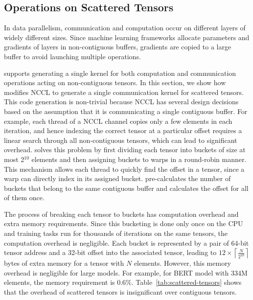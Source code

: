 \subsection{Operations on Scattered Tensors}
\label{sec:scattered-tensors}
In data parallelism, communication and computation occur on different layers of widely different sizes.
Since machine learning frameworks allocate parameters and gradients of layers in non-contiguous buffers,
gradients are copied to a large buffer to avoid launching multiple \allreduce operations.

\tool supports generating a single kernel for both computation and communication operations acting on non-contiguous tensors.
In this section, we show how \tool modifies NCCL to generate a single communication kernel for scattered tensors.
This code generation is non-trivial because NCCL has several design decisions based on the assumption that it is communicating a single contiguous buffer.
For example, each thread of a NCCL channel copies only a few elements in each iteration, and hence indexing the correct tensor at a particular offset requires a linear search through all non-contiguous tensors, which can lead to significant overhead.
\tool solves this problem by first dividing each tensor into buckets of size at most 2$^{10}$ elements and then assigning buckets to warps in a round-robin manner.
This mechanism allows each thread to quickly find the offset in a tensor, since a warp can directly index in its assigned bucket.
\tool pre-calculates the number of buckets that belong to the same contiguous buffer and calculates the offset for all of them once.

The process of breaking each tensor to buckets has computation overhead and extra memory requirements.
Since this bucketing is done only once on the CPU and training tasks run for thousands of iterations on the same tensors, the computation overhead is negligible.
Each bucket is represented by a pair of 64-bit tensor address and a 32-bit offset into the associated tensor, leading to $12 \times \left \lceil \frac{N}{2^{10}}\right \rceil$ bytes of extra memory for a tensor with $N$ elements.
However, this memory overhead is negligible for large models. For example, for BERT model with 334M elements, the memory requirement is 0.6\%.
Table~\ref{tab:scattered-tensors} shows that the overhead of scattered tensors is insignificant over contiguous tensors.

